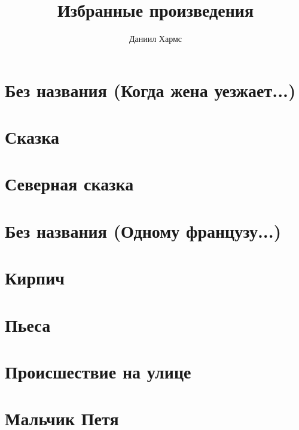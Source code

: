 \documentclass[a4paper,12pt,oneside]{book}\usepackage[T2A]{fontenc}
\title{Избранные произведения}
\author{Даниил Хармс}
\date{}
\begin{document}
\maketitle
\chapter{Без названия (Когда жена уезжает...)}


\chapter{Сказка}


\chapter{Северная сказка}


\chapter{Без названия (Одному французу...)}


\chapter{Кирпич}


\chapter{Пьеса}


\chapter{Происшествие на улице}


\chapter{Мальчик Петя}

\end{document}

